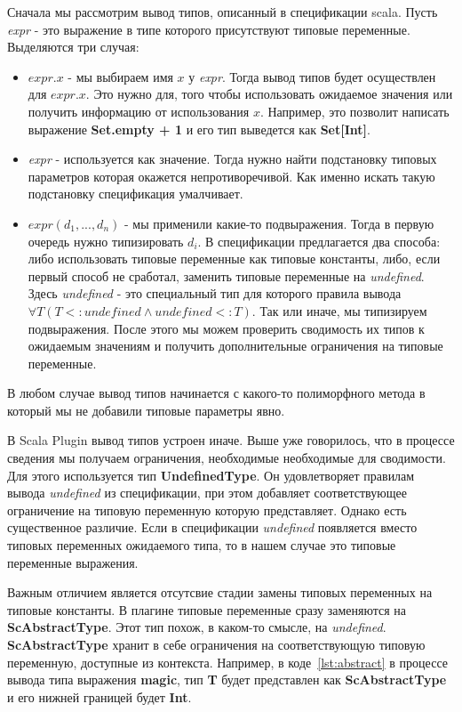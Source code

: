 Сначала мы рассмотрим вывод типов, описанный в спецификации scala.
Пусть \textit{expr} - это выражение в типе которого присутствуют типовые переменные.
Выделяются три случая:
\begin{itemize}
  \item $\mathit{expr}.x$ - мы выбираем имя $x$ у \textit{expr}.
  Тогда вывод типов будет осуществлен для $\mathit{expr}.x$.
  Это нужно для, того чтобы использовать ожидаемое значения или получить
  информацию от использования $x$.
  Например, это позволит написать выражение \textbf{Set.empty + 1} и его тип
  выведется как \textbf{Set[Int]}.
  \item \textit{expr} - используется как значение.
  Тогда нужно найти подстановку типовых параметров которая окажется
  непротиворечивой.
  Как именно искать такую подстановку спецификация умалчивает.
  \item $\mathit{expr}(d_1, ..., d_n)$ - мы применили какие-то подвыражения.
  Тогда в первую очередь нужно типизировать $d_i$.
  В спецификации предлагается два способа:
  либо использовать типовые переменные как типовые константы,
  либо, если первый способ не сработал, заменить типовые переменные на \textit{undefined}.
  Здесь \textit{undefined} - это специальный тип для которого правила вывода
  $\forall T (T <: \mathit{undefined} \land \mathit{undefined} <: T)$.
  Так или иначе, мы типизируем подвыражения.
  После этого мы можем проверить сводимость их типов к ожидаемым значениям и
  получить дополнительные ограничения на типовые переменные.
\end{itemize}

В любом случае вывод типов начинается с какого-то полиморфного метода в который
мы не добавили типовые параметры явно.

В Scala Plugin вывод типов устроен иначе.
Выше уже говорилось, что в процессе сведения мы получаем ограничения, необходимые
необходимые для сводимости.
Для этого используется тип \textbf{UndefinedType}.
Он удовлетворяет правилам вывода \textit{undefined} из спецификации, при этом
добавляет соответствующее ограничение на типовую переменную которую представляет.
Однако есть существенное различие.
Если в спецификации \textit{undefined} появляется вместо типовых переменных
ожидаемого типа, то в нашем случае это типовые переменные выражения.

Важным отличием является отсутсвие стадии замены типовых переменных на
типовые константы. В плагине типовые переменные сразу заменяются на
\textbf{ScAbstractType}.
Этот тип похож, в каком-то смысле, на \textit{undefined}.
\textbf{ScAbstractType} хранит в себе ограничения на соответствующую типовую
переменную, доступные из контекста.
Например, в коде~\ref{lst:abstract} в процессе вывода типа выражения
\textbf{magic}, тип \textbf{T} будет представлен как \textbf{ScAbstractType} и
его нижней границей будет \textbf{Int}.

